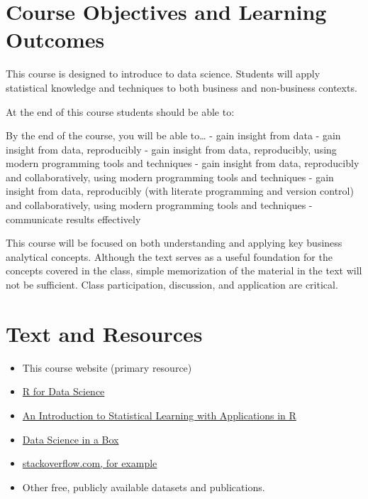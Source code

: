 \documentclass[
]{book}
\providecommand{\tightlist}{%
  \setlength{\itemsep}{0pt}\setlength{\parskip}{0pt}}
\theoremstyle{definition}
\theoremstyle{definition}
\theoremstyle{definition}
\theoremstyle{definition}
\theoremstyle{remark}
\begin{document}
\hypertarget{course-objectives-and-learning-outcomes}{%
\section{Course Objectives and Learning Outcomes}\label{course-objectives-and-learning-outcomes}}

This course is designed to introduce to data science. Students will apply statistical knowledge and techniques to both business and non-business contexts.

At the end of this course students should be able to:

By the end of the course, you will be able to\ldots{}
- gain insight from data
- gain insight from data, reproducibly
- gain insight from data, reproducibly, using modern programming tools and techniques
- gain insight from data, reproducibly and collaboratively, using modern programming tools and techniques
- gain insight from data, reproducibly (with literate programming and version control) and collaboratively, using modern programming tools and techniques
- communicate results effectively

This course will be focused on both understanding and applying key business analytical concepts. Although the text serves as a useful foundation for the concepts covered in the class, simple memorization of the material in the text will not be sufficient. Class participation, discussion, and application are critical.

\hypertarget{text-and-resources}{%
\section{Text and Resources}\label{text-and-resources}}

\begin{itemize}
\tightlist
\item
  This course website (primary resource)
\item
  \href{https://r4ds.had.co.nz/}{R for Data Science}
\item
  \href{https://trevorhastie.github.io/ISLR/}{An Introduction to Statistical Learning with Applications in R}
\item
  \href{https://datasciencebox.org/}{Data Science in a Box}
\item
  \href{https://stackoverflow.com/questions/4862178/remove-rows-with-all-or-some-nas-missing-values-in-data-frame?rq=1}{stackoverflow.com, for example}
\item
  Other free, publicly available datasets and publications.
\end{itemize}
\end{document}
